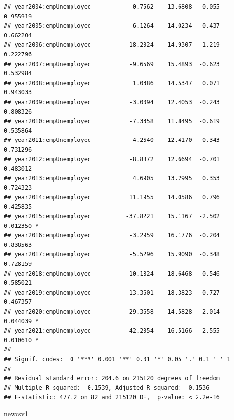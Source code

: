 \documentclass[
]{article}
\newenvironment{Shaded}{\begin{snugshade}}{\end{snugshade}}
\newcommand{\NormalTok}[1]{#1}
\begin{document}
\begin{verbatim}
## year2004:empUnemployed            0.7562    13.6808   0.055 0.955919    
## year2005:empUnemployed           -6.1264    14.0234  -0.437 0.662204    
## year2006:empUnemployed          -18.2024    14.9307  -1.219 0.222796    
## year2007:empUnemployed           -9.6569    15.4893  -0.623 0.532984    
## year2008:empUnemployed            1.0386    14.5347   0.071 0.943033    
## year2009:empUnemployed           -3.0094    12.4053  -0.243 0.808326    
## year2010:empUnemployed           -7.3358    11.8495  -0.619 0.535864    
## year2011:empUnemployed            4.2640    12.4170   0.343 0.731296    
## year2012:empUnemployed           -8.8872    12.6694  -0.701 0.483012    
## year2013:empUnemployed            4.6905    13.2995   0.353 0.724323    
## year2014:empUnemployed           11.1955    14.0586   0.796 0.425835    
## year2015:empUnemployed          -37.8221    15.1167  -2.502 0.012350 *  
## year2016:empUnemployed           -3.2959    16.1776  -0.204 0.838563    
## year2017:empUnemployed           -5.5296    15.9090  -0.348 0.728159    
## year2018:empUnemployed          -10.1824    18.6468  -0.546 0.585021    
## year2019:empUnemployed          -13.3601    18.3823  -0.727 0.467357    
## year2020:empUnemployed          -29.3658    14.5828  -2.014 0.044039 *  
## year2021:empUnemployed          -42.2054    16.5166  -2.555 0.010610 *  
## ---
## Signif. codes:  0 '***' 0.001 '**' 0.01 '*' 0.05 '.' 0.1 ' ' 1
## 
## Residual standard error: 204.6 on 215120 degrees of freedom
## Multiple R-squared:  0.1539, Adjusted R-squared:  0.1536 
## F-statistic: 477.2 on 82 and 215120 DF,  p-value: < 2.2e-16
\end{verbatim}

\begin{Shaded}
\begin{Highlighting}[]
\NormalTok{newcsv1}
\end{Highlighting}
\end{Shaded}
\end{document}
